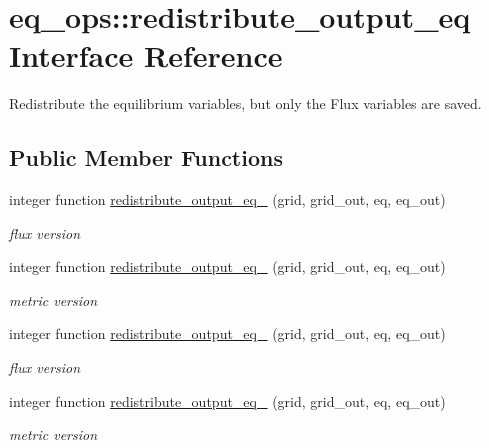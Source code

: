 \hypertarget{interfaceeq__ops_1_1redistribute__output__eq}{}\section{eq\+\_\+ops\+:\+:redistribute\+\_\+output\+\_\+eq Interface Reference}
\label{interfaceeq__ops_1_1redistribute__output__eq}


Redistribute the equilibrium variables, but only the Flux variables are saved.  


\subsection*{Public Member Functions}
\begin{DoxyCompactItemize}
\item 
integer function \hyperlink{interfaceeq__ops_1_1redistribute__output__eq_ac77911cf8c4631896ad2d0fff66e6893}{redistribute\+\_\+output\+\_\+eq\+\_} (grid, grid\+\_\+out, eq, eq\+\_\+out)
\begin{DoxyCompactList}\small\item\em flux version \end{DoxyCompactList}\item 
integer function \hyperlink{interfaceeq__ops_1_1redistribute__output__eq_afdbe3be15436f6abd965bd301ffd819d}{redistribute\+\_\+output\+\_\+eq\+\_} (grid, grid\+\_\+out, eq, eq\+\_\+out)
\begin{DoxyCompactList}\small\item\em metric version \end{DoxyCompactList}\item 
integer function \hyperlink{interfaceeq__ops_1_1redistribute__output__eq_ac77911cf8c4631896ad2d0fff66e6893}{redistribute\+\_\+output\+\_\+eq\+\_} (grid, grid\+\_\+out, eq, eq\+\_\+out)
\begin{DoxyCompactList}\small\item\em flux version \end{DoxyCompactList}\item 
integer function \hyperlink{interfaceeq__ops_1_1redistribute__output__eq_afdbe3be15436f6abd965bd301ffd819d}{redistribute\+\_\+output\+\_\+eq\+\_} (grid, grid\+\_\+out, eq, eq\+\_\+out)
\begin{DoxyCompactList}\small\item\em metric version \end{DoxyCompactList}\end{DoxyCompactItemize}


